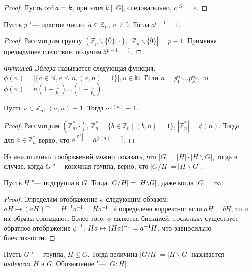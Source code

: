 \begin{proof}
	Пусть $\operatorname{ord}{a} = k$, при этом $k~\big|~|G|$, следовательно, $a^{|G|} = e$.
\end{proof}

\begin{corollary}
	Пусть $p$ "--- простое число, $\overline{a} \hm{\in} \mathbb{Z}_p$, $\overline{a} \ne \overline{0}$. Тогда $\overline{a}^{p-1} = \overline{1}$.
\end{corollary}

\begin{proof}
	Рассмотрим группу $(\mathbb{Z}_p\backslash\{\overline{0}\}, \cdot)$, $|\mathbb{Z}_p\backslash\{\overline{0}\}| = p - 1$. Применяя предыдущее следствие, получим $\overline{a}^{p - 1} = \overline{1}$.
\end{proof}

\begin{definition}
	\textit{Функцией Эйлера} называется следующая функция: $\phi(n) = |\{a \in \mathbb{N}, a \le n, (a, n) = 1\}|, n \in \mathbb{N}$. Если $n = p_1^{\alpha_1}\dots p_k^{\alpha_k}$, то $\phi(n) = n(1 - \frac{1}{p_1})\dots(1 - \frac{1}{p_k})$.
\end{definition}

\begin{theorem}[Эйлера]
	Пусть $\overline{a} \in \mathbb{Z}_n$, $(a, n) = 1$. Тогда $\overline{a}^{\phi(n)} = \overline{1}$.
\end{theorem}

\begin{proof}
	Рассмотрим $(\mathbb{Z}_n^*, \cdot)$, $\mathbb{Z}_n^* = \{\overline{b} \in \mathbb{Z}_n~|~(b, n) = 1\}$, $|\mathbb{Z}_n^*| = \phi(n)$. Тогда для $\overline{a} \in \mathbb{Z}_n^*$ верно, что $\overline{a}^{|\mathbb{Z}_n^*|} = \overline{a}^{\phi(n)} = \overline{1}$.
\end{proof}

\begin{note}
	Из аналогичных соображений можно показать, что $|G| = |H|\cdot|H\backslash G|$, тогда в случае, когда $G$ "--- конечная группа, верно, что $|G / H| = |H\backslash G|$.
\end{note}

\begin{proposition}
	Пусть $H$ "--- подгруппа в $G$. Тогда $|G / H| \hm{=} |H\backslash G|$, даже когда $|G| = \infty$.
\end{proposition}

\begin{proof}
	Определим отображение $\phi$ следующим образом: $aH \mapsto (aH)^{-1} = H^{-1}a^{-1} = Ha^{-1}$. $\phi$ определено корректно: если $aH = bH$, то и их образы совпадают. Более того, $\phi$ является биекцией, поскольку существует обратное отображение $\phi^{-1}$: $Ha \hm{\mapsto} (Ha)^{-1} = a^{-1}H$, что равносильно биективности.
\end{proof}

\begin{definition}
	Пусть $G$ "--- группа, $H \le G$. Тогда величина $|G / H| = |H\backslash G|$ называется \textit{индексом} $H$ в $G$. Обозначение "--- $|G : H|$.
\end{definition}